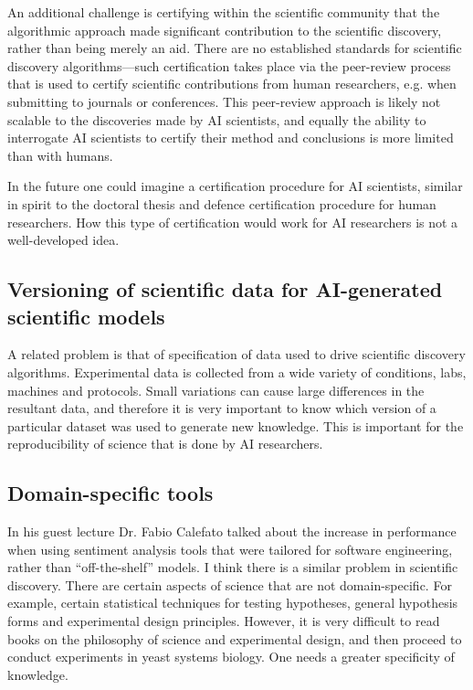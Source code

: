 \documentclass[11pt]{article}
\begin{document}
An additional challenge is certifying within the scientific community that the algorithmic approach made significant contribution to the scientific discovery, rather than being merely an aid.
There are no established standards for scientific discovery algorithms---such certification takes place via the peer-review process that is used to certify scientific contributions from human researchers, e.g. when submitting to journals or conferences.
This peer-review approach is likely not scalable to the discoveries made by AI scientists, and equally the ability to interrogate AI scientists to certify their method and conclusions is more limited than with humans.

In the future one could imagine a certification procedure for AI scientists, similar in spirit to the doctoral thesis and defence certification procedure for human researchers. How this type of certification would work for AI researchers is not a well-developed idea.

\subsection{Versioning of scientific data for AI-generated scientific models}

A related problem is that of specification of data used to drive scientific discovery algorithms.
Experimental data is collected from a wide variety of conditions, labs, machines and protocols. Small variations can cause large differences in the resultant data, and therefore it is very important to know which version of a particular dataset was used to generate new knowledge. This is important for the reproducibility of science that is done by AI researchers.

\subsection{Domain-specific tools}

In his guest lecture Dr. Fabio Calefato talked about the increase in performance when using sentiment analysis tools that were tailored for software engineering, rather than ``off-the-shelf'' models. I think there is a similar problem in scientific discovery. There are certain aspects of science that are not domain-specific. For example, certain statistical techniques for testing hypotheses, general hypothesis forms and experimental design principles. However, it is very difficult to read books on the philosophy of science and experimental design, and then proceed to conduct experiments in yeast systems biology. One needs a greater specificity of knowledge.
\end{document}
